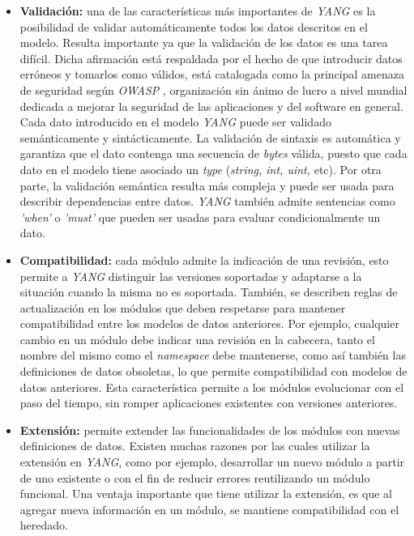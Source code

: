   \begin{itemize}
	\item \textbf{Validación:} una de las características más importantes de \textit{YANG} es la posibilidad de validar automáticamente todos los datos descritos en el modelo. Resulta importante ya que la validación de los datos es una tarea difícil. Dicha afirmación está respaldada por el hecho de que introducir datos erróneos y tomarlos como válidos, está catalogada como la principal amenaza de seguridad según \textit{OWASP} \parencite{owasp}, organización sin ánimo de lucro a nivel mundial dedicada a mejorar la seguridad de las aplicaciones y del software en general. Cada dato introducido en el modelo \textit{YANG} puede ser validado semánticamente y sintácticamente. La validación de sintaxis es automática y garantiza que el dato contenga una secuencia de \textit{bytes} válida, puesto que cada dato en el modelo tiene asociado un \textit{type} (\textit{string, int, uint,} etc). Por otra parte, la validación semántica resulta más compleja y puede ser usada para describir dependencias entre datos. \textit{YANG} también admite sentencias como \textit{'when'} o \textit{'must'} que pueden ser usadas para evaluar condicionalmente un dato.  
	\item \textbf{Compatibilidad:} cada módulo admite la indicación de una revisión, esto permite a \textit{YANG} distinguir las versiones soportadas y adaptarse a la situación cuando la misma no es soportada. También, se describen reglas de actualización en los módulos que deben respetarse para mantener compatibilidad entre los modelos de datos anteriores. Por ejemplo, cualquier cambio en un módulo debe indicar una revisión en la cabecera, tanto el nombre del mismo como el \textit{namespace} debe mantenerse, como así también las definiciones de datos obsoletas, lo que permite compatibilidad con modelos de datos anteriores. Esta característica permite a los módulos evolucionar con el paso del tiempo, sin romper aplicaciones existentes con versiones anteriores.
	\item \textbf{Extensión:} permite extender las funcionalidades de los módulos con nuevas definiciones de datos. Existen muchas razones por las cuales utilizar la extensión en \textit{YANG}, como por ejemplo, desarrollar un nuevo módulo a partir de uno existente o con el fin de reducir errores reutilizando un módulo funcional. Una ventaja importante que tiene utilizar la extensión, es que al agregar nueva información en un módulo, se mantiene compatibilidad con el heredado.
\end{itemize}

